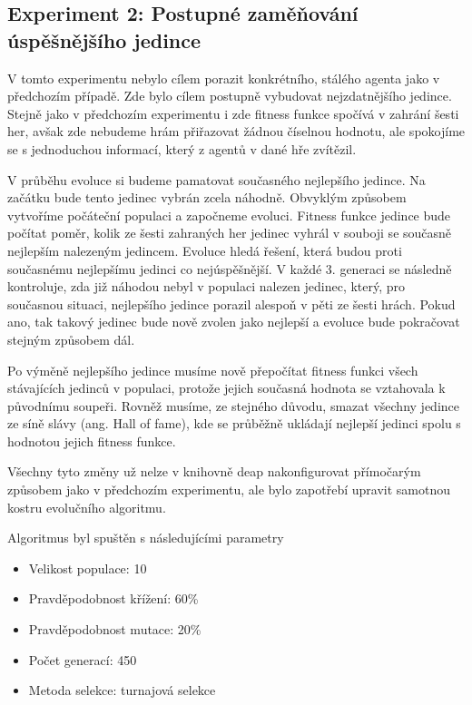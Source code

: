 \subsection{Experiment 2: Postupné zaměňování úspěšnějšího jedince}
V tomto experimentu nebylo cílem porazit konkrétního, stálého agenta jako v předchozím případě.
Zde bylo cílem postupně vybudovat nejzdatnějšího jedince.
Stejně jako v předchozím experimentu i zde fitness funkce spočívá v zahrání šesti her,
avšak zde nebudeme hrám přiřazovat žádnou číselnou hodnotu, ale spokojíme se s jednoduchou informací, který z agentů v dané hře zvítězil.
\par
V průběhu evoluce si budeme pamatovat současného nejlepšího jedince. 
Na začátku bude tento jedinec vybrán zcela náhodně. Obvyklým způsobem vytvoříme počáteční populaci a započneme evoluci.
Fitness funkce jedince bude počítat poměr, kolik ze šesti zahraných her jedinec vyhrál v souboji se současně nejlepším nalezeným jedincem.
Evoluce hledá řešení, která budou proti současnému nejlepšímu jedinci co nejúspěšnější.
V každé 3. generaci se následně kontroluje, zda již náhodou nebyl v populaci nalezen jedinec, který, pro současnou situaci, nejlepšího jedince porazil alespoň v pěti ze šesti hrách.
Pokud ano, tak takový jedinec bude nově zvolen jako nejlepší a evoluce bude pokračovat stejným způsobem dál.
\par
Po výměně nejlepšího jedince musíme nově přepočítat fitness funkci všech stávajících jedinců v populaci, protože jejich současná hodnota se vztahovala k původnímu soupeři.
Rovněž musíme, ze stejného důvodu, smazat všechny jedince ze síně slávy (ang. Hall of fame), kde se průběžně ukládají nejlepší jedinci spolu s hodnotou jejich fitness funkce.

\par
Všechny tyto změny už nelze v knihovně deap nakonfigurovat přímočarým způsobem jako v předchozím experimentu, ale bylo zapotřebí upravit samotnou kostru evolučního algoritmu.

\par
Algoritmus byl spuštěn s následujícími parametry
\begin{itemize}
    \item Velikost populace: 10
    \item Pravděpodobnost křížení: 60\%
    \item Pravděpodobnost mutace: 20\%
    \item Počet generací: 450
    \item Metoda selekce: turnajová selekce
\end{itemize}

